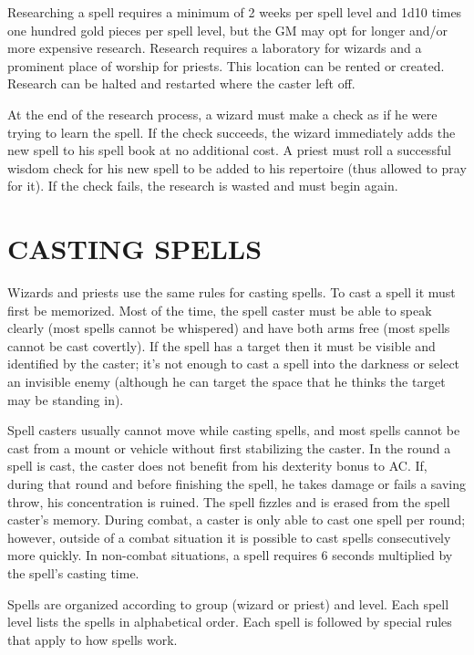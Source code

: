 \begin{multicols}{2}
Researching a spell requires a minimum of 2 weeks per spell level and 1d10 times one hundred gold pieces per spell level, but the GM may opt for longer and/or more expensive research.  Research requires a laboratory for wizards and a prominent place of worship for priests.  This location can be rented or created.  Research can be halted and restarted where the caster left off. 

At the end of the research process, a wizard must make a check as if he were trying to learn the spell.  If the check succeeds, the wizard immediately adds the new spell to his spell book at no additional cost.  A priest must roll a successful wisdom check for his new spell to be added to his repertoire (thus allowed to pray for it).  If the check fails, the research is wasted and must begin again.

\section{CASTING SPELLS}

Wizards and priests use the same rules for casting spells.  To cast a spell it must first be memorized.  Most of the time, the spell caster must be able to speak clearly (most spells cannot be whispered) and have both arms free (most spells cannot be cast covertly).  If the spell has a target then it must be visible and identified by the caster; it's not enough to cast a spell into the darkness or select an invisible enemy (although he can target the space that he thinks the target may be standing in).  

Spell casters usually cannot move while casting spells, and most spells cannot be cast from a mount or vehicle without first stabilizing the caster.  In the round a spell is cast, the caster does not benefit from his dexterity bonus to AC.  If, during that round and before finishing the spell, he takes damage or fails a saving throw, his concentration is ruined.  The spell fizzles and is erased from the spell caster's memory.  During combat, a caster is only able to cast one spell per round; however, outside of a combat situation it is possible to cast spells consecutively more quickly.  In non-combat situations, a spell requires 6 seconds multiplied by the spell's casting time.

Spells are organized according to group (wizard or priest) and level.  Each spell level lists the spells in alphabetical order.  Each spell is followed by special rules that apply to how spells work.


\end{multicols}
